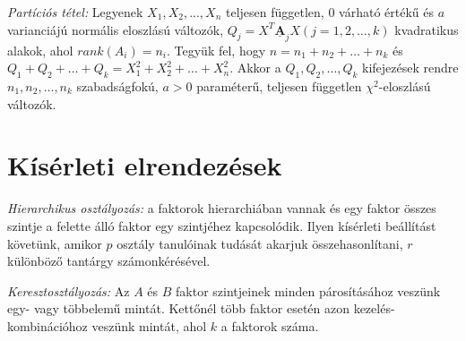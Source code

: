 \emph{Partíciós tétel:} Legyenek $X_1, X_2,...,X_n$ teljesen független, $0$ várható értékű és $a$ varianciájú normális eloszlású változók, $Q_j=X^T\mathbf{\underline{A}}_jX  (j=1,2,…, k)$ kvadratikus alakok, ahol $rank(A_i)=n_i$. Tegyük fel, hogy $n= n_1+ n_2+ …+n_k$ és $Q_1+ Q_2+ …+ Q_k = X_1^2+X_2^2+ …+X_n^2$. Akkor a $Q_1, Q_2, …, Q_k$ kifejezések rendre $n_1, n_2, …, n_k$ szabadságfokú, $a>0$ paraméterű, teljesen független $\chi^2$-eloszlású változók.

\section{Kísérleti elrendezések}

\emph{Hierarchikus osztályozás:} a faktorok hierarchiában vannak és egy faktor összes szintje a felette álló faktor egy szintjéhez kapcsolódik. Ilyen kísérleti beállítást követünk, amikor $p$ osztály tanulóinak tudását akarjuk összehasonlítani, $r$ különböző tantárgy számonkérésével.

\emph{Keresztosztályozás:} Az $A$ és $B$ faktor szintjeinek minden párosításához veszünk egy- vagy többelemű mintát. Kettőnél több faktor esetén azon kezelés-kombinációhoz veszünk mintát, ahol $k$ a faktorok száma.

